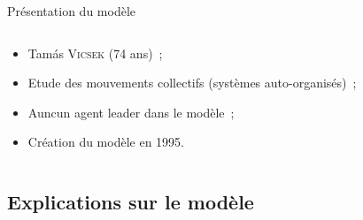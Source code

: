 \documentclass[aspectratio=43, a4paper, 12pt]{beamer}
\begin{document}
\begin{frame}{Présentation du modèle}
\begin{columns}
			\begin{column}{0.5\paperwidth}
				\begin{itemize}
					\item<1-> Tamás \textsc{Vicsek} (74 ans)~;
					\item<2-> Etude des mouvements collectifs (systèmes auto-organisés)~;
					\item<3-> Auncun agent leader dans le modèle~;
					\item<4-> Création du modèle en 1995.
				\end{itemize}			
			\end{column}
		\end{columns}		
	\end{frame}
	
\subsection{Explications sur le modèle}
\end{document}
